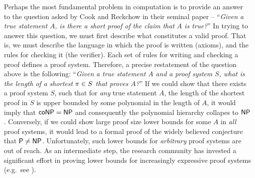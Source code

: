 \documentclass[11pt]{article}
\begin{document}
Perhaps the most fundamental problem in computation is to provide an answer to the question asked by Cook and Reckchow in their seminal paper \citep{cook1979relative} -- ``\textit{Given a true statement $A$, is there a short proof of the claim that $A$ is true?}''
In trying to answer this question, we must first describe what constitutes a valid proof. That is, we must describe the language in which the proof is written (axioms), and the rules for checking it (the verifier).
Each set of rules for writing and checking a proof defines a proof system.
Therefore, a precise restatement of the question above is the following:  ``\textit{Given a true statement $A$ and a proof system $S$, what is the length of a shortest $\pi \in S$ that proves $A$?}''
If we could show that there exists a proof system $S$, such that for \emph{any} true statement $A$, the length of the shortest proof in $S$ is upper bounded by some polynomial in the length of $A$, it would imply that $\mathsf{coNP} = \mathsf{NP}$ and consequently the polynomial hierarchy collapes to $\mathsf{NP}$. 
Conversely, if we could show large proof size lower bounds for some $A$ in \emph{all} proof systems, it would lead to a formal proof of the widely believed conjecture that $\mathsf{P} \neq \mathsf{NP}$.
Unfortunately, such lower  bounds for \emph{arbitrary} proof systems are out of reach.
As an intermediate step,
the research community has invested a significant effort in proving lower bounds for increasingly expressive proof systems (e.g.\ see \citep{abascal2021strongly, alekhnovich2001lower, atserias2020Size, buss1999linear,  conneryd2023graph, de2023clique, impagliazzo1999lower,  kothari2017SumOfSquares, potechin:LIPIcs.CCC.2020.38, raz2008elusive, razborov1998lower, schoenebeck2008linear}). \par
\end{document}
